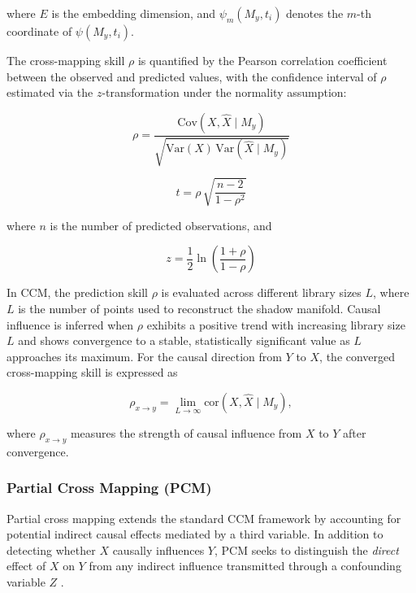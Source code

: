 \documentclass[authoryear,preprint,review,12pt]{elsarticle}
\begin{document}
\noindent where $E$ is the embedding dimension, and $\psi_m(M_y, t_i)$ denotes the $m$-th coordinate of $\psi(M_y, t_i)$.

The cross-mapping skill $\rho$ is quantified by the Pearson correlation coefficient between the observed and predicted values, with the confidence interval of $\rho$ estimated via the $z$-transformation under the normality assumption:

\begin{equation}\label{eq_ccm_rho}
\rho = \frac{\mathrm{Cov}\left( X, \hat{X} \mid M_y \right)}{ \sqrt{\mathrm{Var}(X) \, \mathrm{Var}\left( \hat{X} \mid M_y \right) } }
\end{equation}

\begin{equation}\label{eq_ccm_tstat}
t = \rho \, \sqrt{\frac{n - 2}{1 - \rho^2}} 
\end{equation}

\noindent where $n$ is the number of predicted observations, and

\begin{equation}\label{eq_ccm_zstat}
z = \frac{1}{2} \ln \left( \frac{1 + \rho}{1 - \rho} \right)
\end{equation}

In CCM, the prediction skill $\rho$ is evaluated across different library sizes $L$, where $L$ is the number of points used to reconstruct the shadow manifold. Causal influence is inferred when $\rho$ exhibits a positive trend with increasing library size $L$ and shows convergence to a stable, statistically significant value as $L$ approaches its maximum. For the causal direction from $Y$ to $X$, the converged cross-mapping skill is expressed as

\begin{equation}\label{eq_ccm_convergence}
\rho_{x \to y} = \lim_{L \to \infty} \mathrm{cor} \left( X, \hat{X} \mid M_y \right),
\end{equation}

\noindent where $\rho_{x \to y}$ measures the strength of causal influence from $X$ to $Y$ after convergence.

\subsubsection{Partial Cross Mapping (PCM)}

Partial cross mapping extends the standard CCM framework by accounting for potential indirect causal effects mediated by a third variable. In addition to detecting whether $X$ causally influences $Y$, PCM seeks to distinguish the \emph{direct} effect of $X$ on $Y$ from any indirect influence transmitted through a confounding variable $Z$ \citep{leng2020pcm}.
\end{document}
